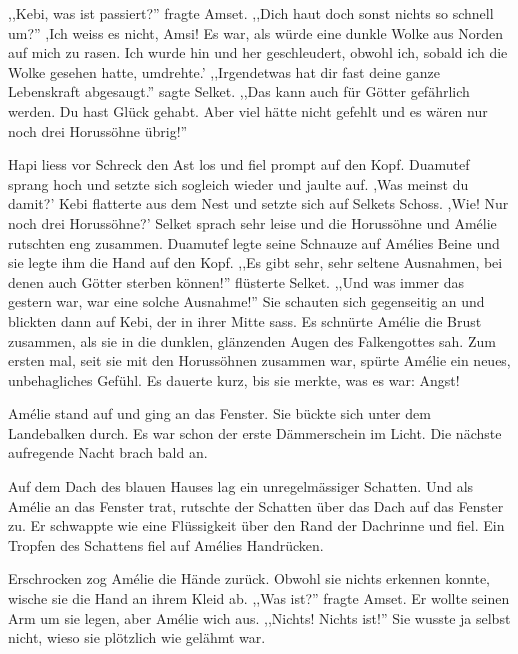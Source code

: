 \documentclass[11pt,titlepage,a5paper]{book}
\begin{document}
,,Kebi, was ist passiert?'' fragte Amset. ,,Dich haut doch sonst nichts so schnell um?'' ,Ich weiss es nicht, Amsi! Es war, als würde eine dunkle Wolke aus Norden auf mich zu rasen. Ich wurde hin und her geschleudert, obwohl ich, sobald ich die Wolke gesehen hatte, umdrehte.' ,,Irgendetwas hat dir fast deine ganze Lebenskraft abgesaugt.'' sagte Selket. ,,Das kann auch für Götter gefährlich werden. Du hast Glück gehabt. Aber viel hätte nicht gefehlt und es wären nur noch drei Horussöhne übrig!'' 

Hapi liess vor Schreck den Ast los und fiel prompt auf den Kopf. Duamutef sprang hoch und setzte sich sogleich wieder und jaulte auf. ,Was meinst du damit?' Kebi flatterte aus dem Nest und setzte sich auf Selkets Schoss. ,Wie! Nur noch drei Horussöhne?' Selket sprach sehr leise und die Horussöhne und Amélie rutschten eng zusammen. Duamutef legte seine Schnauze auf Amélies Beine und sie legte ihm die Hand auf den Kopf. ,,Es gibt sehr, sehr seltene Ausnahmen, bei denen auch Götter sterben können!'' flüsterte Selket. ,,Und was immer das gestern war, war eine solche Ausnahme!'' Sie schauten sich gegenseitig an und blickten dann auf Kebi, der in ihrer Mitte sass. Es schnürte Amélie die Brust zusammen, als sie in die dunklen, glänzenden Augen des Falkengottes sah. Zum ersten mal, seit sie mit den Horussöhnen zusammen war, spürte Amélie ein neues, unbehagliches Gefühl. Es dauerte kurz, bis sie merkte, was es war: Angst!

Amélie stand auf und ging an das Fenster. Sie bückte sich unter dem Landebalken durch. Es war schon der erste Dämmerschein im Licht. Die nächste aufregende Nacht brach bald an. 

Auf dem Dach des blauen Hauses lag ein unregelmässiger Schatten. Und als Amélie an das Fenster trat, rutschte der Schatten über das Dach auf das Fenster zu. Er schwappte wie eine Flüssigkeit über den Rand der Dachrinne und fiel. Ein Tropfen des Schattens fiel auf Amélies Handrücken.

Erschrocken zog Amélie die Hände zurück. Obwohl sie nichts erkennen konnte, wische sie die Hand an ihrem Kleid ab. ,,Was ist?'' fragte Amset. Er wollte seinen Arm um sie legen, aber Amélie wich aus. ,,Nichts! Nichts ist!'' Sie wusste ja selbst nicht, wieso sie plötzlich wie gelähmt war.
\end{document}
